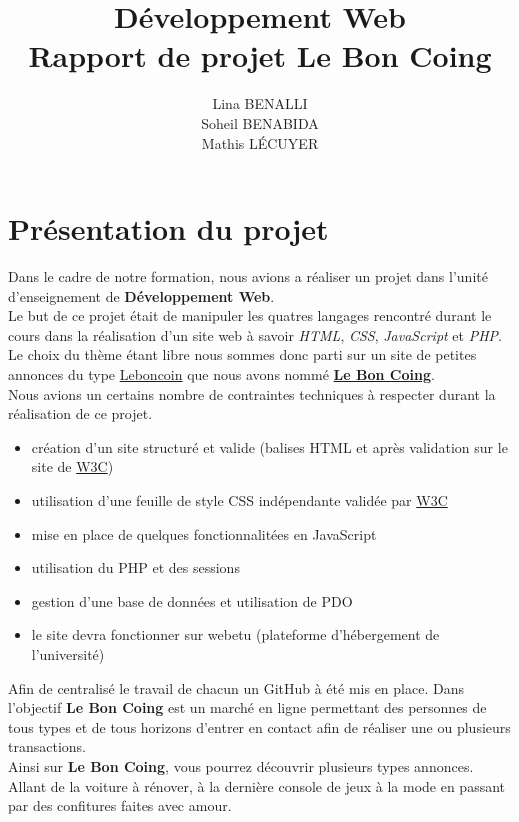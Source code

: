 \documentclass[11pt,a4paper]{article}
\title{Développement Web\\Rapport de projet \textbf{Le Bon Coing}}
\author{Lina BENALLI\\Soheil BENABIDA\\Mathis LÉCUYER}
\date{}
\begin{document}
\maketitle

\newpage

\tableofcontents

\newpage

\section{Présentation du projet}
Dans le cadre de notre formation, nous avions a réaliser un projet dans l'unité d'enseignement de \textbf{Développement Web}.\\
Le but de ce projet était de manipuler les quatres langages rencontré durant le cours dans la réalisation d'un site web à savoir \emph{HTML}, \emph{CSS}, \emph{JavaScript} et \emph{PHP}.\\
Le choix du thème étant libre nous sommes donc parti sur un site de petites annonces du type \underline{Leboncoin} que nous avons nommé \underline{\textbf{Le Bon Coing}}.\\
Nous avions un certains nombre de contraintes techniques à respecter durant la réalisation de ce projet. 
\begin{itemize}
    \item création d'un site structuré et valide (balises HTML et après validation sur le site de \href{https://validator.w3.org}{W3C})
    \item utilisation d'une feuille de style CSS indépendante validée par \href{https://jigsaw.w3.org/css-validator/}{W3C}
    \item mise en place de quelques fonctionnalitées en JavaScript
    \item utilisation du PHP et des sessions
    \item gestion d'une base de données et utilisation de PDO
    \item le site devra fonctionner sur webetu (plateforme d'hébergement de l'université)
\end{itemize}
Afin de centralisé le travail de chacun un GitHub à été mis en place.
Dans l'objectif \textbf{Le Bon Coing} est un marché en ligne permettant des personnes de tous types et de tous horizons d'entrer en contact afin de réaliser une ou plusieurs transactions.\\
Ainsi sur \textbf{Le Bon Coing}, vous pourrez découvrir plusieurs types annonces. Allant de la voiture à rénover, à la dernière console de jeux à la mode en passant par des confitures faites avec amour.
\end{document}
